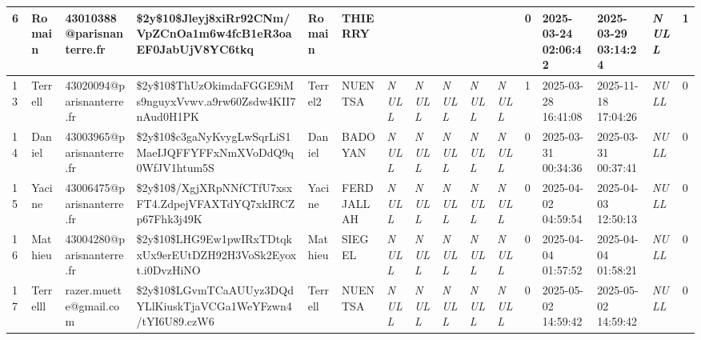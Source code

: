 \begin{longtable}{|l|l|l|l|l|l|l|l|l|l|l|l|l|l|l|l|}
6 & Romain & 43010388@parisnanterre.fr & \$2y\$10\$Jleyj8xiRr92CNm/VpZCnOa1m6w4fcB1eR3oaEF0JabUjV8YC6tkq & Romain & THIERRY &  &  &  &  &  & 0 & 2025-03-24 02:06:42 & 2025-03-29 03:14:24 & \textit{NULL} & 1 \\ \hline 
13 & Terrell & 43020094@parisnanterre.fr & \$2y\$10\$ThUzOkimdaFGGE9iMs9nguyxVvwv.a9rw60Zsdw4KII7nAud0H1PK & Terrel2 & NUENTSA & \textit{NULL} & \textit{NULL} & \textit{NULL} & \textit{NULL} & \textit{NULL} & 1 & 2025-03-28 16:41:08 & 2025-11-18 17:04:26 & \textit{NULL} & 0 \\ \hline 
14 & Daniel & 43003965@parisnanterre.fr & \$2y\$10\$c3gaNyKvygLwSqrLiS1MaeIJQFFYFFxNmXVoDdQ9q0WfJV1htum5S & Daniel & BADOYAN & \textit{NULL} & \textit{NULL} & \textit{NULL} & \textit{NULL} & \textit{NULL} & 0 & 2025-03-31 00:34:36 & 2025-03-31 00:37:41 & \textit{NULL} & 0 \\ \hline 
15 & Yacine & 43006475@parisnanterre.fr & \$2y\$10\$/XgjXRpNNfCTfU7xsxFT4.ZdpejVFAXTdYQ7xkIRCZp67Fhk3j49K & Yacine & FERDJALLAH & \textit{NULL} & \textit{NULL} & \textit{NULL} & \textit{NULL} & \textit{NULL} & 0 & 2025-04-02 04:59:54 & 2025-04-03 12:50:13 & \textit{NULL} & 0 \\ \hline 
16 & Mathieu & 43004280@parisnanterre.fr & \$2y\$10\$LHG9Ew1pwIRxTDtqkxUx9erEUtDZH92H3VoSk2Eyoxt.i0DvzHiNO & Mathieu & SIEGEL & \textit{NULL} & \textit{NULL} & \textit{NULL} & \textit{NULL} & \textit{NULL} & 0 & 2025-04-04 01:57:52 & 2025-04-04 01:58:21 & \textit{NULL} & 0 \\ \hline 
17 & Terrelll & razer.muette@gmail.com & \$2y\$10\$LGvmTCaAUUyz3DQdYLlKiuskTjaVCGa1WeYFzwn4/tYI6U89.czW6 & Terrell & NUENTSA & \textit{NULL} & \textit{NULL} & \textit{NULL} & \textit{NULL} & \textit{NULL} & 0 & 2025-05-02 14:59:42 & 2025-05-02 14:59:42 & \textit{NULL} & 0 \\ \hline 
 \end{longtable}

